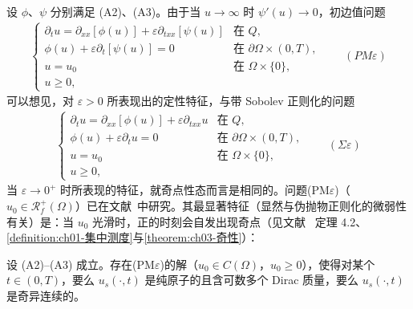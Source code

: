 \documentclass[../main.tex]{subfiles}
\begin{document}
设 $\phi$、$\psi$ 分别满足 (A2)、(A3)。由于当 $u\to\infty$ 时 $\psi'(u)\to0$，初边值问题
\begin{align*}
\begin{cases}
\partial_t u = \partial_{xx}[\phi(u)] + \varepsilon\partial_{txx}[\psi(u)] & \text{在 }Q,\\
\phi(u) + \varepsilon\partial_t[\psi(u)] = 0 & \text{在 }\partial\Omega\times(0,T),\\
u=u_0 & \text{在 }\Omega\times\{0\},\\
u\geqslant0,
\end{cases}
\qquad(PM\varepsilon)
\end{align*}
可以想见，对 $\varepsilon>0$ 所表现出的定性特征，与带 Sobolev 正则化的问题
\begin{align*}
\begin{cases}
\partial_t u = \partial_{xx}[\phi(u)] + \varepsilon\partial_{txx}u & \text{在 }Q,\\
\phi(u) + \varepsilon\partial_t u = 0 & \text{在 }\partial\Omega\times(0,T),\\
u=u_0 & \text{在 }\Omega\times\{0\},\\
u\geqslant0,
\end{cases}
\qquad(\Sigma\varepsilon)
\end{align*}
当 $\varepsilon\to0^+$ 时所表现的特征，就奇点性态而言是相同的。问题(PM$\varepsilon$)（$u_0\in\mathscr{R}^+_f(\Omega)$）已在文献~\cite{ref99,ref100}中研究。其最显著特征（显然与伪抛物正则化的微弱性有关）是：当 $u_0$ 光滑时，正的时刻会自发出现奇点（见文献~\cite{ref22} 定理 4.2、\cref{definition:ch01-集中测度}与\cref{theorem:ch03-奇性}）：

\begin{proposition}\label{proposition:intro-0.3.3}
设 (A2)--(A3) 成立。存在(PM$\varepsilon$)的解（$u_0\in C(\Omega)$，$u_0\geqslant0$），使得对某个 $t\in(0,T)$，要么 $u_s(\cdot,t)$ 是纯原子的且含可数多个 Dirac 质量，要么 $u_s(\cdot,t)$ 是奇异连续的。
\end{proposition}
\end{document}

